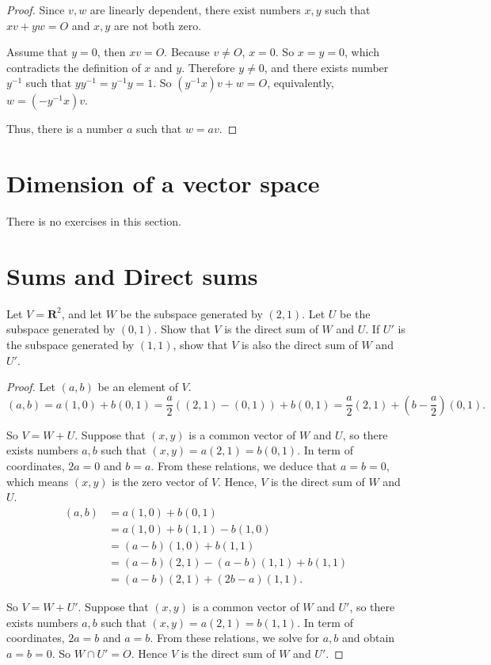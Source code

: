 \begin{proof}
    Since $v, w$ are linearly dependent, there exist numbers $x, y$ such that $xv + yw = O$ and $x, y$ are not both zero.

    Assume that $y = 0$, then $xv = O$. Because $v\ne O$, $x = 0$. So $x = y = 0$, which contradicts the definition of $x$ and $y$. Therefore $y\ne 0$, and there exists number $y^{-1}$ such that $yy^{-1} = y^{-1}y = 1$. So $(y^{-1}x)v + w = O$, equivalently, $w = (-y^{-1}x)v$.

    Thus, there is a number $a$ such that $w = av$.
\end{proof}

\section{Dimension of a vector space}

There is no exercises in this section.

\section{Sums and Direct sums}

\begin{exercise}
    Let $V = \mathbf{R}^{2}$, and let $W$ be the subspace generated by $(2, 1)$. Let $U$ be the subspace generated by $(0, 1)$. Show that $V$ is the direct sum of $W$ and $U$. If $U'$ is the subspace generated by $(1, 1)$, show that $V$ is also the direct sum of $W$ and $U'$.
\end{exercise}

\begin{proof}
    Let $(a, b)$ be an element of $V$.
    \[
        (a, b) = a(1, 0) + b(0, 1) = \frac{a}{2}((2, 1) - (0, 1)) + b(0, 1) = \frac{a}{2}(2, 1) + \left(b - \frac{a}{2}\right)(0, 1).
    \]

    So $V = W + U$. Suppose that $(x, y)$ is a common vector of $W$ and $U$, so there exists numbers $a, b$ such that $(x, y) = a(2, 1) = b(0, 1)$. In term of coordinates, $2a = 0$ and $b = a$. From these relations, we deduce that $a = b = 0$, which means $(x, y)$ is the zero vector of $V$. Hence, $V$ is the direct sum of $W$ and $U$.
    \begin{align*}
        (a, b) & = a(1, 0) + b(0, 1)                       \\
               & = a(1, 0) + b(1, 1) - b(1, 0)             \\
               & = (a - b)(1, 0) + b(1, 1)                 \\
               & = (a - b)(2, 1) - (a - b)(1, 1) + b(1, 1) \\
               & = (a - b)(2, 1) + (2b - a)(1, 1).
    \end{align*}

    So $V = W + U'$. Suppose that $(x, y)$ is a common vector of $W$ and $U'$, so there exists numbers $a, b$ such that $(x, y) = a(2, 1) = b(1, 1)$. In term of coordinates, $2a = b$ and $a = b$. From these relations, we solve for $a, b$ and obtain $a = b = 0$. So $W\cap U' = O$. Hence $V$ is the direct sum of $W$ and $U'$.
\end{proof}


